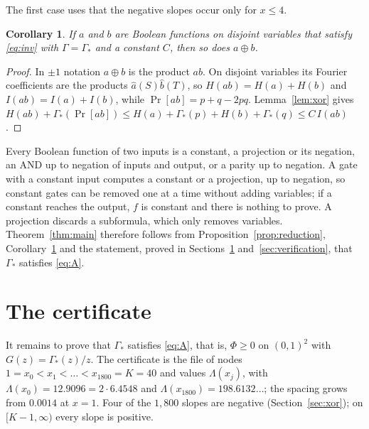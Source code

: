 \documentclass[11pt]{amsart}
\newtheorem{corollary}[theorem]{Corollary}
\theoremstyle{remark}
\renewcommand{\Pr}{\operatorname{Pr}}
\begin{document}
The first case uses that the negative slopes occur only for $x\le4$.

\begin{corollary}\label{cor:xor}
If $a$ and $b$ are Boolean functions on disjoint variables that satisfy \eqref{eq:inv} with $\Gamma=\Gamma_*$ and a constant $C$, then so does $a\oplus b$.
\end{corollary}

\begin{proof}
In $\pm1$ notation $a\oplus b$ is the product $ab$. On disjoint variables its Fourier coefficients are the products $\hat a(S)\hat b(T)$, so $H(ab)=H(a)+H(b)$ and $I(ab)=I(a)+I(b)$, while $\Pr[ab]=p+q-2pq$. Lemma~\ref{lem:xor} gives $H(ab)+\Gamma_*(\Pr[ab])\le H(a)+\Gamma_*(p)+H(b)+\Gamma_*(q)\le C\,I(ab)$.
\end{proof}

Every Boolean function of two inputs is a constant, a projection or its negation, an AND up to negation of inputs and output, or a parity up to negation. A gate with a constant input computes a constant or a projection, up to negation, so constant gates can be removed one at a time without adding variables; if a constant reaches the output, $f$ is constant and there is nothing to prove. A projection discards a subformula, which only removes variables. Theorem~\ref{thm:main} therefore follows from Proposition~\ref{prop:reduction}, Corollary~\ref{cor:xor} and the statement, proved in Sections~\ref{sec:certificate} and~\ref{sec:verification}, that $\Gamma_*$ satisfies \eqref{eq:A}.

\section{The certificate}\label{sec:certificate}

It remains to prove that $\Gamma_*$ satisfies \eqref{eq:A}, that is, $\Phi\ge0$ on $(0,1)^2$ with $G(z)=\Gamma_*(z)/z$. The certificate is the file of nodes $1=x_0<x_1<\ldots<x_{1800}=K=40$ and values $\Lambda(x_j)$, with $\Lambda(x_0)=12.9096=2\cdot6.4548$ and $\Lambda(x_{1800})=198.6132\ldots$; the spacing grows from $0.0014$ at $x=1$. Four of the $1{,}800$ slopes are negative (Section~\ref{sec:xor}); on $[K-1,\infty)$ every slope is positive.
\end{document}
